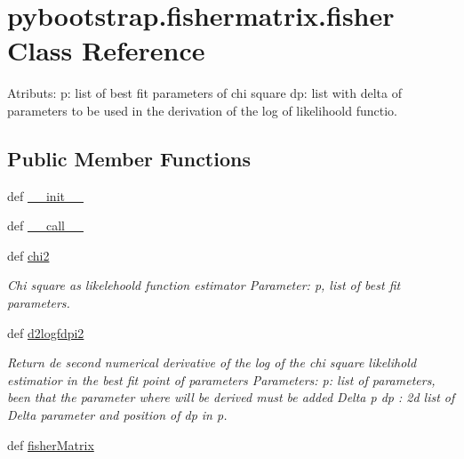 \hypertarget{classpybootstrap_1_1fishermatrix_1_1fisher}{\section{pybootstrap.\-fishermatrix.\-fisher Class Reference}
\label{classpybootstrap_1_1fishermatrix_1_1fisher}
}


Atributs\-: p\-: list of best fit parameters of chi square dp\-: list with delta of parameters to be used in the derivation of the log of likelihoold functio.  


\subsection*{Public Member Functions}
\begin{DoxyCompactItemize}
\item 
def \hyperlink{classpybootstrap_1_1fishermatrix_1_1fisher_a52bd5794ed9d00b592ad53d4423ed669}{\-\_\-\-\_\-init\-\_\-\-\_\-}
\item 
def \hyperlink{classpybootstrap_1_1fishermatrix_1_1fisher_aa704febfe7dd8bc90e58ca89d36bd655}{\-\_\-\-\_\-call\-\_\-\-\_\-}
\item 
def \hyperlink{classpybootstrap_1_1fishermatrix_1_1fisher_a802373485dfa7931ccdb6c8110fe4090}{chi2}
\begin{DoxyCompactList}\small\item\em Chi square as likelehoold function estimator Parameter\-: p, list of best fit parameters. \end{DoxyCompactList}\item 
def \hyperlink{classpybootstrap_1_1fishermatrix_1_1fisher_ab381a6f83d046ae85826811f0f96ff14}{d2logfdpi2}
\begin{DoxyCompactList}\small\item\em Return de second numerical derivative of the log of the chi square likelihold estimatior in the best fit point of parameters Parameters\-: p\-: list of parameters, been that the parameter where will be derived must be added Delta p dp \-: 2d list of Delta parameter and position of dp in p. \end{DoxyCompactList}\item 
def \hyperlink{classpybootstrap_1_1fishermatrix_1_1fisher_acffdf4e368fabe7da1495612bc6224d9}{fisher\-Matrix}
\end{DoxyCompactItemize}
